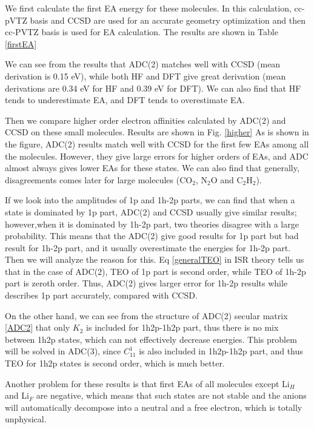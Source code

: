 We first calculate the first EA energy for these molecules.
In this calculation, cc-pVTZ basis and CCSD are used for an accurate geometry optimization and then cc-PVTZ basis is used for EA calculation.
The results are shown in Table \ref{firstEA}

We can see from the results that ADC(2) matches well with CCSD (mean derivation is 0.15 eV), while both HF and DFT give great derivation (mean derivations are 0.34 eV for HF and 0.39 eV for DFT).
We can also find that HF tends to underestimate EA, and DFT tends to overestimate EA.

Then we compare higher order electron affinities calculated by ADC(2) and CCSD on these small molecules.
Results are shown in Fig. \ref{higher}
As is shown in the figure, ADC(2) results match well with CCSD for the first few EAs among all the molecules.
However, they give large errors for higher orders of EAs, and ADC almost always gives lower EAs for these states.
We can also find that generally, disagreements comes later for large molecules (CO$_2$, N$_2$O and C$_2$H$_2$).

If we look into the amplitudes of 1p and 1h-2p parts, we can find that when a state is dominated by 1p part, ADC(2) and CCSD usually give similar results; however,when it is dominated by 1h-2p part, two theories disagree with a large probability.
This means that the ADC(2) give good results for 1p part but bad result for 1h-2p part, and it usually overestimate the energies for 1h-2p part.
Then we will analyze the reason for this.
Eq \ref{generalTEO} in ISR theory tells us that in the case of ADC(2), TEO of 1p part is second order, while TEO of 1h-2p part is zeroth order.
Thus, ADC(2) gives larger error for 1h-2p results while describes 1p part accurately, compared with CCSD.

On the other hand, we can see from the structure of ADC(2) secular matrix \ref{ADC2} that only $K_2$ is included for 1h2p-1h2p part, thus there is no mix between 1h2p states, which can not effectively decrease energies.
This problem will be solved in ADC(3), since $C^1_{11}$ is also included in 1h2p-1h2p part, and thus TEO for 1h2p states is second order, which is much better.

Another problem for these results is that first EAs of all molecules except Li$_H$ and Li$_F$ are negative, which means that such states are not stable and the anions will automatically decompose into a neutral and a free electron, which is totally unphysical.

